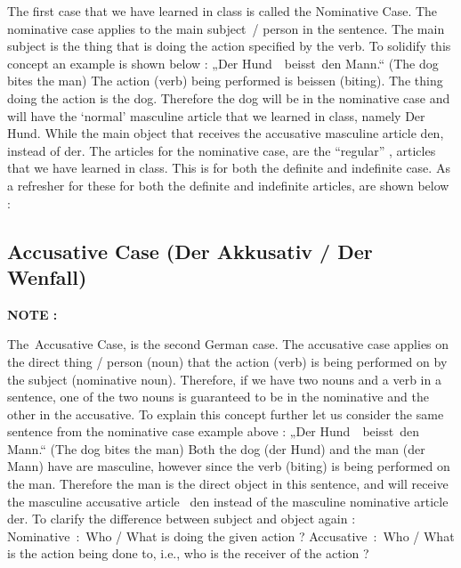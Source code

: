 \documentclass[a4paper,12pt]{article}
\begin{document}
The first case that we have learned in class is called the Nominative Case. The
nominative case applies to the main subject / person in the sentence. The main
subject is the thing that is doing the action specified by the verb.
To solidify this concept an example is shown below :
„Der Hund  beisst den Mann.“ (The dog bites the man)
The action (verb) being performed is beissen (biting). The thing doing the
action is the dog. Therefore the dog will be in the nominative case and will
have the ‘normal’ masculine article that we learned in class, namely Der Hund.
While the main object that receives the accusative masculine article den,
instead of der.
The articles for the nominative case, are the “regular” , articles that we have
learned in class. This is for both the definite and indefinite case. As a
refresher for these for both the definite and indefinite articles, are shown
below :


\subsection{\bf{Accusative Case (Der Akkusativ / Der Wenfall)}}
\begin{adjustwidth}{2em}{0pt}
\label{sec:accusative_case_akkusativ_wenfall_}



\end{adjustwidth}

\vspace{0.25cm}
\color{flame} \textbf {NOTE :} \color{black} 

The Accusative Case, is the second German case. The accusative case applies on
the direct thing / person (noun) that the action (verb) is being performed on by
the subject (nominative noun).
Therefore, if we have two nouns and a verb in a sentence, one of the two nouns
is guaranteed to be in the nominative and the other in the accusative. To
explain this concept further let us consider the same sentence from the
nominative case example above :
„Der Hund  beisst den Mann.“ (The dog bites the man)
Both the dog (der Hund) and the man (der Mann) have are masculine, however since
the verb (biting) is being performed on the man. Therefore the man is the direct
object in this sentence, and will receive the masculine accusative article  den
instead of the masculine nominative article der.
To clarify the difference between subject and object again :
Nominative : Who / What is doing the given action ?
Accusative : Who / What is the action being done to, i.e., who is the receiver
of the action ?
\end{document}
